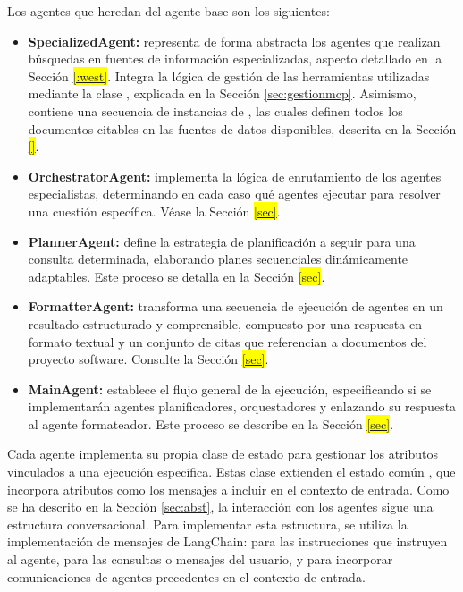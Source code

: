 Los agentes que heredan del agente base son los siguientes:
\begin{itemize}
  \item \textbf{SpecializedAgent:} representa de forma abstracta los agentes que realizan búsquedas en fuentes de información especializadas, aspecto detallado en la Sección \colorbox{yellow}{\ref{:west}}. Integra la lógica de gestión de las herramientas utilizadas mediante la clase , explicada en la Sección \ref{sec:gestionmcp}. Asimismo, contiene una secuencia de instancias de , las cuales definen todos los documentos citables en las fuentes de datos disponibles, descrita en la Sección \colorbox{yellow}{\ref{}}.
  \item \textbf{OrchestratorAgent:} implementa la lógica de enrutamiento de los agentes especialistas, determinando en cada caso qué agentes ejecutar para resolver una cuestión específica. Véase la Sección \colorbox{yellow}{\ref{sec}}.
  \item \textbf{PlannerAgent:} define la estrategia de planificación a seguir para una consulta determinada, elaborando planes secuenciales dinámicamente adaptables. Este proceso se detalla en la Sección \colorbox{yellow}{\ref{sec}}.
  \item \textbf{FormatterAgent:} transforma una secuencia de ejecución de agentes en un resultado estructurado y comprensible, compuesto por una respuesta en formato textual y un conjunto de citas que referencian a documentos del proyecto software. Consulte la Sección \colorbox{yellow}{\ref{sec}}.
  \item \textbf{MainAgent:} establece el flujo general de la ejecución, especificando si se implementarán agentes planificadores, orquestadores y enlazando su respuesta al agente formateador. Este proceso se describe en la Sección \colorbox{yellow}{\ref{sec}}.
\end{itemize}

Cada agente implementa su propia clase de estado para gestionar los atributos vinculados a una ejecución específica. Estas clase extienden el estado común , que incorpora atributos como los mensajes a incluir en el contexto de entrada. Como se ha descrito en la Sección \ref{sec:abst}, la interacción con los agentes sigue una estructura conversacional. Para implementar esta estructura, se utiliza la implementación de mensajes de LangChain:  para las instrucciones que instruyen al agente,  para las consultas o mensajes del usuario, y  para incorporar comunicaciones de agentes precedentes en el contexto de entrada.

